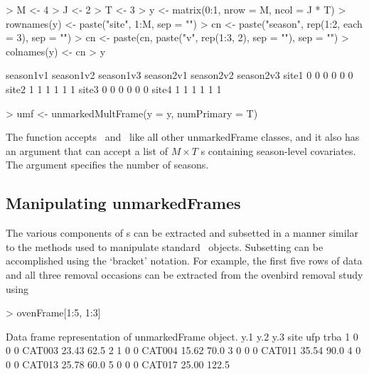 \documentclass[article,shortnames]{jss}
\newcommand{\rlang}{\proglang{R}}
\newcommand{\scovs}{\code{siteCovs}}
\newcommand{\ocovs}{\code{obsCovs}}
\begin{document}
{\begin{Schunk}
\begin{Sinput}
> M <- 4
> J <- 2
> T <- 3
> y <- matrix(0:1, nrow = M, ncol = J * T)
> rownames(y) <- paste("site", 1:M, sep = "")
> cn <- paste("season", rep(1:2, each = 3), sep = "")
> cn <- paste(cn, paste("v", rep(1:3, 2), sep = ""), sep = "")
> colnames(y) <- cn
> y
\end{Sinput}
\begin{Soutput}
      season1v1 season1v2 season1v3 season2v1 season2v2 season2v3
site1         0         0         0         0         0         0
site2         1         1         1         1         1         1
site3         0         0         0         0         0         0
site4         1         1         1         1         1         1
\end{Soutput}
\begin{Sinput}
> umf <- unmarkedMultFrame(y = y, numPrimary = T)
\end{Sinput}
\end{Schunk}

The function  accepts \scovs\ and \ocovs\ like all 
other unmarkedFrame classes, and it also has an argument 
that can accept a list of $M \times T$ s containing 
season-level covariates. The  argument specifies the 
number of seasons.

\subsection{Manipulating unmarkedFrames}
\label{sec:manip}

The various components of s can be extracted and 
subsetted in a manner similar to the methods used to manipulate standard 
\rlang\ objects.  Subsetting can be accomplished using the `bracket' 
notation. For example, the first five rows of data and all three 
removal occasions can be extracted from the ovenbird removal study using

\begin{Schunk}
\begin{Sinput}
> ovenFrame[1:5, 1:3]
\end{Sinput}
\begin{Soutput}
Data frame representation of unmarkedFrame object.
  y.1 y.2 y.3   site   ufp  trba
1   0   0   0 CAT003 23.43  62.5
2   1   0   0 CAT004 15.62  70.0
3   0   0   0 CAT011 35.54  90.0
4   0   0   0 CAT013 25.78  60.0
5   0   0   0 CAT017 25.00 122.5
\end{Soutput}
\end{Schunk}

}
\end{document}
